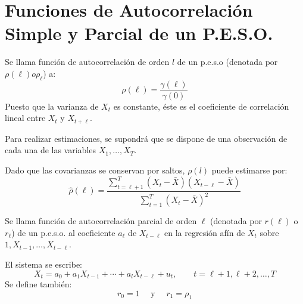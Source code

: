 \section{Funciones de Autocorrelaci\'{o}n Simple y Parcial de un P.E.S.O.}

\begin{definicion}
 Se llama funci\'{o}n de autocorrelaci\'{o}n de orden $l$ de un p.e.s.o (denotada por $\rho \left( \ell \right) o \rho_{\ell}$) a:
\[
\rho \left( \ell \right)=\frac{\gamma (\ell)}{\gamma (0)}
\]
Puesto que la varianza de $X_{t}$ es constante, \'{e}ste es el coeficiente de correlaci\'{o}n lineal entre $X_{t}$ y $X_{t+\ell}$.
\end{definicion}

\begin{observacion}
 Para realizar estimaciones, se supondr\'{a} que se dispone de una observaci\'{o}n de cada una de las variables $X_{1},\ldots, X_{T}$.\newline

Dado que las covarianzas se conservan por saltos, $\rho \left( l \right)$ puede estimarse por:
\[
\widehat{\rho }(\ell)=\frac{\displaystyle \sum_{t=\ell+1}^T (X_{t}-\bar{X})(X_{t-\ell}-\bar{X}) }{\displaystyle \sum_{t=1}^T (X_{t}-\bar{X})^{2} }
\]
\end{observacion}

\begin{definicion}
 Se llama funci\'{o}n de autocorrelaci\'{o}n parcial de orden $\ell$ (denotada por $r\left( \ell \right)$ o $r_{\ell}$) de un p.e.s.o. al coeficiente $a_{\ell}$ de $X_{t-\ell}$ en la regresi\'{o}n af\'{i}n de $X_{t}$ sobre $1, X_{t-1},\ldots, X_{t-\ell}$.
\end{definicion}

El sistema se escribe:
\[
X_{t}=a_{0}+a_{1}X_{t-1}+\cdots +a_{l}X_{t-\ell}+u_{t}, \qquad t=\ell+1, \ell+2,\ldots ,T
\]
Se define tambi\'{e}n:
\[
 r_{0} =1\quad\text{ y }\quad r_{1} =\rho_{1}
\]

